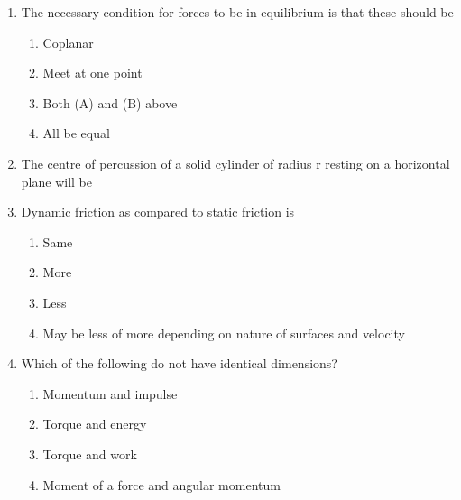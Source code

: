 \documentclass[11pt,a4paper]{article}
\begin{document}
\begin{enumerate}
\\
\item{The necessary condition for forces to be in equilibrium is that these should be}
\begin{enumerate}[label=\Alph*.]
\item{Coplanar}
\item{Meet at one point}
\item{Both (A) and (B) above}
\item{All be equal}
\end{enumerate}
\item{The centre of percussion of a solid cylinder of radius r resting on a horizontal plane will be}
\\
\item{Dynamic friction as compared to static friction is}
\begin{enumerate}[label=\Alph*.]
\item{Same}
\item{More}
\item{Less}
\item{May be less of more depending on nature of surfaces and velocity}
\end{enumerate}
\item{Which of the following do not have identical dimensions?}
\begin{enumerate}[label=\Alph*.]
\item{Momentum and impulse}
\item{Torque and energy}
\item{Torque and work}
\item{Moment of a force and angular momentum}
\end{enumerate}

\end{enumerate}
\end{document}
